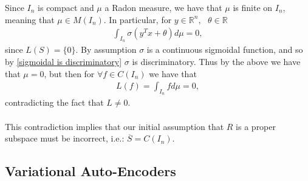 \documentclass{article}
\theoremstyle{definition}
\begin{document}
Since $I_n$ is compact and $\mu$ a Radon measure, we have that $\mu$ is finite on $I_n$, meaning that $\mu \in M(I_n)$.
In particular, for $ y \in \mathbb{R}^n, \text{ }\theta \in \mathbb{R}$ 
\begin{align*}
    \int_{I_n} \sigma \left(y^T x + \theta \right) d \mu = 0,
\end{align*}
since $L(S) = \{0\}$.
By assumption $\sigma$ is a continuous sigmoidal function, and  so by \ref{sigmoidal is discriminatory} $\sigma$ is discriminatory. Thus by the above we have that $\mu = 0$, but then for $\forall f \in C(I_n)$ we have that 
\begin{align*}
    L(f)=\int_{I_n} f d\mu = 0,
\end{align*}
contradicting the fact that $L \neq 0$.\\\\
This contradiction implies that our initial assumption that $R$ is a proper subspace must be incorrect, i.e.: $\overline{S}=C(I_n).$

\subsection{Variational Auto-Encoders}
\end{document}
